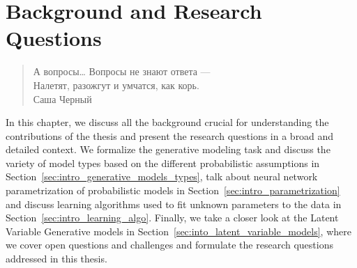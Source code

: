 \chapter{Background and Research Questions}\label{ch:background}
\begin{quote}
\normalsize\itshape
\begin{flushright}
\foreignlanguage{russian}{А вопросы… Вопросы не знают ответа —}\\
\foreignlanguage{russian}{Налетят, разожгут и умчатся, как корь.} \\
\foreignlanguage{russian}{Саша Черный} \\ \vskip 20pt
\end{flushright}
\end{quote}


In this chapter, we discuss all the background crucial for understanding the contributions of the thesis and present the research questions in a broad and detailed context. We formalize the generative modeling task and discuss the variety of model types based on the different probabilistic assumptions in Section~\ref{sec:intro_generative_models_types}, talk about neural network parametrization of probabilistic models in Section~\ref{sec:intro_parametrization} and discuss learning algorithms used to fit unknown parameters to the data in Section~\ref{sec:intro_learning_algo}. Finally, we take a closer look at the Latent Variable Generative models in Section~\ref{sec:into_latent_variable_models}, where we cover open questions and challenges and formulate the research questions addressed in this thesis.

